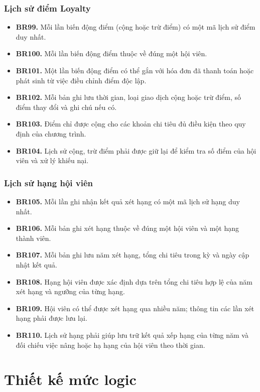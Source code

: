 \documentclass[11pt, a4paper]{article}
\begin{document}
\subsubsection{Lịch sử điểm Loyalty}
\begin{itemize}
    \item \textbf{BR99.} Mỗi lần biến động điểm (cộng hoặc trừ điểm) có một mã lịch sử điểm duy nhất.
    \item \textbf{BR100.} Mỗi lần biến động điểm thuộc về đúng một hội viên.
    \item \textbf{BR101.} Một lần biến động điểm có thể gắn với hóa đơn đã thanh toán hoặc phát sinh từ việc điều chỉnh điểm độc lập.
    \item \textbf{BR102.} Mỗi bản ghi lưu thời gian, loại giao dịch cộng hoặc trừ điểm, số điểm thay đổi và ghi chú nếu có.
    \item \textbf{BR103.} Điểm chỉ được cộng cho các khoản chi tiêu đủ điều kiện theo quy định của chương trình.
    \item \textbf{BR104.} Lịch sử cộng, trừ điểm phải được giữ lại để kiểm tra số điểm của hội viên và xử lý khiếu nại.
\end{itemize}

\subsubsection{Lịch sử hạng hội viên}
\begin{itemize}
    \item \textbf{BR105.} Mỗi lần ghi nhận kết quả xét hạng có một mã lịch sử hạng duy nhất.
    \item \textbf{BR106.} Mỗi bản ghi xét hạng thuộc về đúng một hội viên và một hạng thành viên.
    \item \textbf{BR107.} Mỗi bản ghi lưu năm xét hạng, tổng chi tiêu trong kỳ và ngày cập nhật kết quả.
    \item \textbf{BR108.} Hạng hội viên được xác định dựa trên tổng chi tiêu hợp lệ của năm xét hạng và ngưỡng của từng hạng.
    \item \textbf{BR109.} Hội viên có thể được xét hạng qua nhiều năm; thông tin các lần xét hạng phải được lưu lại.
    \item \textbf{BR110.} Lịch sử hạng phải giúp lưu trữ kết quả xếp hạng của từng năm và đối chiếu việc nâng hoặc hạ hạng của hội viên theo thời gian.
\end{itemize}

\newpage

\section{Thiết kế mức logic}
\end{document}
